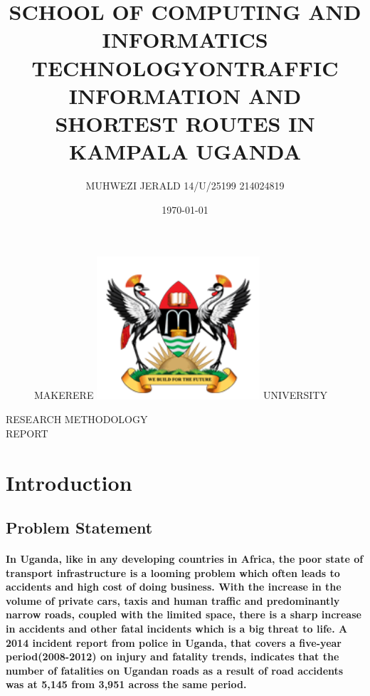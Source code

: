 \documentclass[11pt]{article}
\begin{document}
		
\title{SCHOOL OF COMPUTING AND INFORMATICS\\ TECHNOLOGY}
\author{MUHWEZI JERALD 14/U/25199 214024819}
\date{\today{}}
\begin{figure}
	\begin{center}
	\Huge MAKERERE \includegraphics[width=172pt]{muk.png} \Huge UNIVERSITY
	\end{center}
\end{figure}
	\maketitle
	
	\begin{center}
	RESEARCH METHODOLOGY \\REPORT
	\end{center}
\begin{center}
	\title{ON}
\end{center}
	\begin{center}
		\title{TRAFFIC INFORMATION AND SHORTEST ROUTES IN KAMPALA UGANDA}
	\end{center}
   
	\newpage
	\section{ \textbf{Introduction} }
	  
	 \subsection{\textbf{Problem Statement}}
	 \paragraph{\textmd{In Uganda, like in any developing countries in Africa, the poor state of transport infrastructure is a looming problem which often leads to accidents and high cost of doing business. With the increase in the volume of private cars, taxis and human traffic and predominantly narrow roads, coupled with the limited space, there is a sharp increase in accidents and other fatal incidents which is a big threat to life. A 2014 incident report from police in Uganda, that covers a five-year period(2008-2012) on injury and fatality trends, indicates that the number of fatalities on Ugandan roads as a result of road accidents was at 5,145 from 3,951 across the same period.}}
	 
\end{document}
